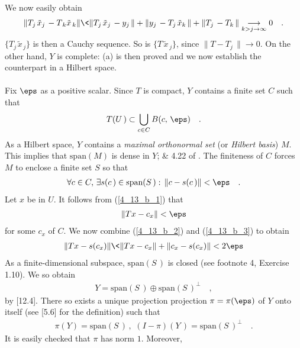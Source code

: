 We now easily obtain
\begin{align}\label{4_13_a_3}
\| T_{j\,} \tilde{x}_{j\,}  -T_{\, k} \tilde{x}_{\, k}\| \<
\| T_{j\,} \tilde{x}_{j\,}- y_{j\,}\| +
\| y_{j\,} -T_{j\,} \tilde{x}_{k\,}\| +
\| T_{j\,} - T_{ k\,}\|   \underset{k> j\to \infty}{\longrightarrow}0\quad .
\end{align}
$\{T_{ j\,} \tilde{x}_{\, j} \}$ is then a Cauchy sequence. So is $\{T \,\tilde{x}_{\, j}\}$, since $\| T-T_{j}\,\| \to 0$. On the other hand, $Y$ is complete: (a) is then proved and we now establish the counterpart in a Hilbert space.\\
\\
Fix $\eps$ as a positive scalar. Since $T$ is compact, $Y$ contains a finite set $C$ such that 
\begin{align}\label{4_13_b_1}
T(U\,)\subset \bigcup_{c\in C} B(c,\, \eps)\quad .
\end{align}
As a Hilbert space, $Y$ contains a \textsl{maximal orthonormal set} (or \textsl{Hilbert basis}) $M$. This implies that $\text{span}(M)$ is dense in $Y$;  \& 4.22 of \cite{Big_Rudin}. The finiteness of $C$ forces $M$ to enclose a finite set $S$ so that 
\begin{align}\label{4_13_b_2}
\forall c\in C, \, \exists  s(c\,) \in \text{span} (S\,):\, \|c - s(c\,)\| <\eps\quad .
\end{align}
Let $x$ be in $U$. It follows from (\ref{4_13_b_1}) that 
\begin{align}\label{4_13_b_3}
\|Tx - c_x \| < \eps
\end{align}
for some $c_x$ of $C$. We now combine (\ref{4_13_b_2}) and (\ref{4_13_b_3}) to obtain
\begin{align}
\|Tx - s(c_x) \| \<  \| Tx - c_x \| + \| c_x - s(c_x)\| < 2\eps
\end{align}
As a finite-dimensional subspace, $\text{span}(S\,)$ is closed (see footnote 4, Exercise 1.10). We so obtain
\begin{align}
Y=\text{span}(S\,)\oplus \text{span}(S\,)^\bot \quad ,
\end{align}
by [12.4]. There so exists a unique projection projection $\pi=\pi(\eps)$ of $Y$ onto itself (see [5.6] for the definition) such that
\begin{align}
\pi (Y) = \text{span}(S\,)\, ,\,  \,  (I-\pi)(Y\,) = \text{span}(S\,)^\bot\quad .
\end{align}
It is easily checked that $\pi$ has norm $1$. Moreover,
